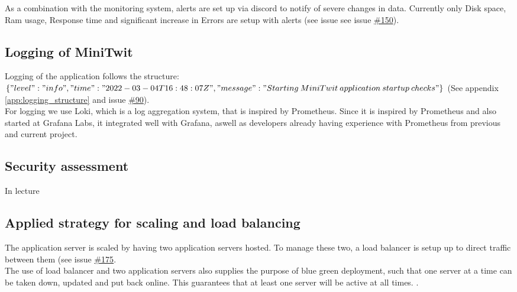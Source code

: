 As a combination with the monitoring system, alerts are set up via discord to notify of severe changes in data. Currently only Disk space, Ram usage, Response time and significant increase in Errors are setup with alerts (see issue see issue \href{https://github.com/DevelOpsITU/MiniTwit/issues/150}{\#150}).


\subsection{Logging of MiniTwit}
Logging of the application follows the structure: \\
$\{"level":"info","time":"2022-03-04T16:48:07Z",\\"message":"Starting\: MiniTwit\: application\: startup\: checks"\}$ (See appendix \ref{app:logging_structure} and issue \href{https://github.com/DevelOpsITU/MiniTwit/issues/90}{\#90}).\\

For logging we use Loki, which is a log aggregation system, that is inspired by Prometheus\cite{grafana_loki}\cite{grafana_loki_docs}. Since it is inspired by Prometheus and also started at Grafana Labs, it integrated well with Grafana, aswell as developers already having experience with Prometheus from previous and current project. 

\subsection{Security assessment}
In lecture


\subsection{Applied strategy for scaling and load balancing}
The application server is scaled by having two application servers hosted. To manage these two, a load balancer is setup up to direct traffic between them (see issue \href{https://github.com/DevelOpsITU/MiniTwit/issues/175}{\#175}. \\
The use of load balancer and two application servers also supplies the purpose of blue green deployment, such that one server at a time can be taken down, updated and put back online. This guarantees that at least one server will be active at all times.  \cite{blue_green_deployment}.

